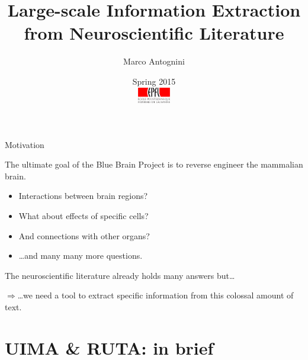 \documentclass[10pt, compress, xcolor={usenames,dvipsnames}]{beamer}
\title{Large-scale Information Extraction from Neuroscientific Literature}
\author{Marco Antognini}
\date{%
  \small Spring 2015\\[2em]
  \includegraphics[height=7mm]{img/epfl-logo}}
\newcommand{\SmallArrow}{\ding{228}}
\newcommand{\BigArrow}{$\Longrightarrow$} %
\renewcommand{\emph}[1]{\alert{#1}}
\begin{document}
\begin{frame}
  \titlepage
\end{frame}


\begin{frame}[fragile]{Motivation}

  \begin{myquote}
    The ultimate goal of the \emph{Blue Brain Project} is to reverse engineer
    the mammalian brain.
  \end{myquote}

  \begin{itemize}[label=\SmallArrow]

    \item Interactions between brain regions?

    \item What about effects of specific cells?

    \item And connections with other organs?

    \item \ldots and many many more questions.

  \end{itemize}


  The neuroscientific \emph{literature} already holds many answers but\ldots

  \pause

  \BigArrow \ldots we need a tool to \emph{extract specific information}
  from this colossal amount of text.

\end{frame}

\section{UIMA \& RUTA: in brief}



\end{document}
